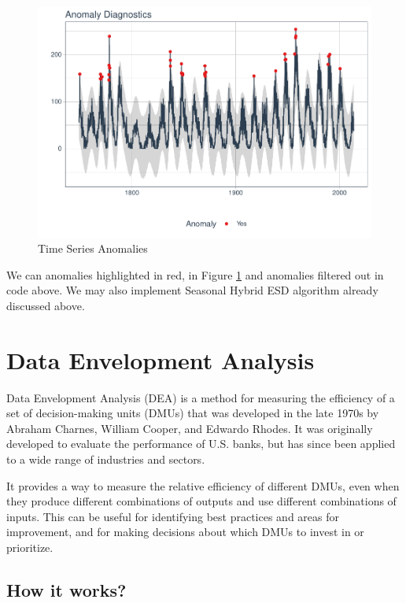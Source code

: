 \documentclass[
]{book}
\begin{document}
\begin{figure}

{\centering \includegraphics[width=0.9\linewidth]{DauR_files/figure-latex/an17-1} 

}

\caption{Time Series Anomalies}\label{fig:an17}
\end{figure}

We can anomalies highlighted in red, in Figure \ref{fig:an17} and anomalies filtered out in code above. We may also implement Seasonal Hybrid ESD algorithm already discussed above.

\hypertarget{data-envelopment-analysis}{%
\chapter{Data Envelopment Analysis}\label{data-envelopment-analysis}}

Data Envelopment Analysis (DEA) is a method for measuring the efficiency of a set of decision-making units (DMUs) that was developed in the late 1970s by Abraham Charnes, William Cooper, and Edwardo Rhodes. It was originally developed to evaluate the performance of U.S. banks, but has since been applied to a wide range of industries and sectors.

It provides a way to measure the relative efficiency of different DMUs, even when they produce different combinations of outputs and use different combinations of inputs. This can be useful for identifying best practices and areas for improvement, and for making decisions about which DMUs to invest in or prioritize.

\hypertarget{how-it-works}{%
\section{How it works?}\label{how-it-works}}
\end{document}
